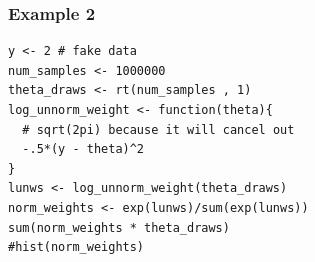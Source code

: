 \documentclass{beamer}
\begin{document}
\begin{frame}[fragile]
\frametitle{Example 2}


\begin{verbatim}
y <- 2 # fake data
num_samples <- 1000000
theta_draws <- rt(num_samples , 1)
log_unnorm_weight <- function(theta){ 
  # sqrt(2pi) because it will cancel out 
  -.5*(y - theta)^2
}
lunws <- log_unnorm_weight(theta_draws)
norm_weights <- exp(lunws)/sum(exp(lunws))
sum(norm_weights * theta_draws)
#hist(norm_weights)
\end{verbatim}


\end{frame}


% 
% 
% 
% 
% 
% 
% 
% 
% 
% 
\end{document}
